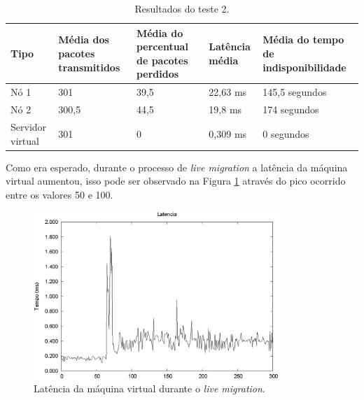\begin{table}[h!]
\caption{Resultados do teste 2.}
\label{tab:teste2resultados}
\begin{center}
\begin{tabular}{|l|p{2.5cm}|p{2.5cm}|p{1.5cm}|p{3cm}|}\hline
\textbf{Tipo} & \textbf{Média dos pacotes transmitidos} & \textbf{Média do percentual de pacotes perdidos} & \textbf{Latência média} & \textbf{Média do tempo de indisponibilidade} \\\hline
Nó 1 & 301 & 39,5 & 22,63 ms & 145,5 segundos \\\hline
Nó 2 & 300,5 & 44,5 & 19,8 ms & 174 segundos\\\hline
Servidor virtual & 301 & 0 & 0,309 ms & 0 segundos \\\hline
\end{tabular}
\end{center}
\end{table}


Como era esperado, durante o processo de \textit{live migration} a latência da máquina virtual aumentou, isso pode ser observado na Figura 
\ref{fig:teste2_latencia} através do pico ocorrido entre os valores 50 e 100.
\begin{figure}[h!]
 \centering
 \includegraphics[width=350px]{img/teste2_latencia.eps}
 \caption{Latência da máquina virtual durante o \textit{live migration}.}
 \label{fig:teste2_latencia}
\end{figure}

